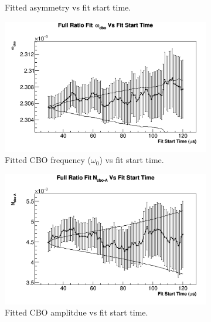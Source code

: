 \begin{figure}[]
\begin{subfigure}[t]{0.45\textwidth}
	    \caption{Fitted asymmetry vs fit start time.}
    \end{subfigure}
    \begin{subfigure}[t]{0.45\textwidth}
	    \centering
		\includegraphics[width=\textwidth]{RatioCBO_omega_cbo_FS_Canv}
	    \caption{Fitted CBO frequency ($\omega_{0}$) vs fit start time.}
    \end{subfigure}%
    \vspace{4mm}
    \begin{subfigure}[t]{0.45\textwidth}
	    \centering
		\includegraphics[width=\textwidth]{RatioCBO_N_cbo-A_FS_Canv}
	    \caption{Fitted CBO amplitdue vs fit start time.}
    \end{subfigure}
    \begin{subfigure}[t]{0.45\textwidth}
	    \centering

\end{subfigure}
\end{figure}
